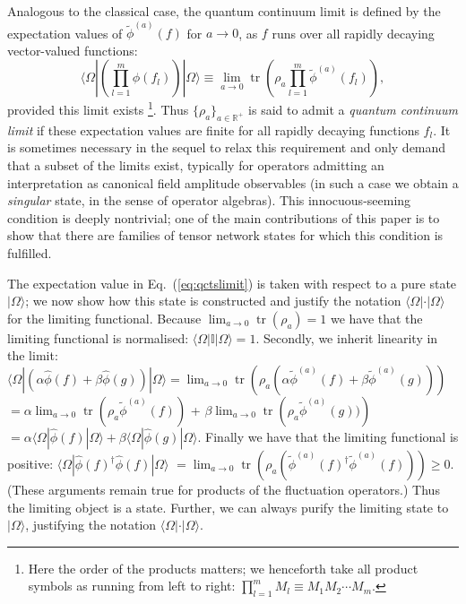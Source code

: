 \documentclass[prl,twocolumn,lengthcheck,superscriptaddress]{revtex4-1}
\newcommand{\tr}{\operatorname{tr}}
\theoremstyle{definition}
\theoremstyle{remark}
\begin{document}
Analogous to the classical case, the quantum continuum limit is defined by the expectation values of $\widetilde{\phi}^{(a)}(f)$ for $a\rightarrow 0$, as $f$ runs over all rapidly decaying vector-valued functions:
\begin{equation}\label{eq:qctslimit}
	\langle\Omega|\left(\prod_{l=1}^m\widehat{\phi}(f_l)\right)|\Omega\rangle \equiv \lim_{a\rightarrow 0} \tr\left(\rho_a \prod_{l=1}^m\widetilde{\phi}^{(a)}(f_l)\right),
\end{equation}
provided this limit exists \footnote{Here the order of the products matters; we henceforth take all product symbols as running from left to right: $\prod_{l=1}^m M_l \equiv M_1M_2\cdots M_m$.}. Thus $\{\rho_a\}_{a\in\mathbb{R}^+}$ is said to admit a \emph{quantum continuum limit} if these expectation values are finite for all rapidly decaying functions $f_l$. It is sometimes necessary in the sequel to relax this requirement and only demand that a subset of the limits exist, typically for operators admitting an interpretation as canonical field amplitude observables (in such a case we obtain a \emph{singular} state, in the sense of operator algebras). This innocuous-seeming condition is deeply nontrivial; one of the main contributions of this paper is to show that there are families of tensor network states for which this condition is fulfilled. 

The expectation value in Eq.~(\ref{eq:qctslimit}) is taken with respect to a pure state $|\Omega\rangle$; we now show how this state is constructed and justify the notation $\langle\Omega|\cdot |\Omega\rangle$ for the limiting functional. Because $\lim_{a\rightarrow0} \tr(\rho_a) = 1$ we have that the limiting functional is normalised: $\langle\Omega| \mathbb{I} |\Omega\rangle = 1$. Secondly, we inherit linearity in the limit: $\langle \Omega| (\alpha \widehat{\phi}(f) + \beta\widehat{\phi}(g))|\Omega\rangle = \lim_{a\rightarrow 0} \tr\left(\rho_a \left(\alpha \widetilde{\phi}^{(a)}(f) + \beta \widetilde{\phi}^{(a)}(g)\right) \right)$ $= \alpha\lim_{a\rightarrow 0} \tr\left(\rho_a  \widetilde{\phi}^{(a)}(f)\right)$ + $\beta\lim_{a\rightarrow 0} \tr\left(\rho_a \widetilde{\phi}^{(a)}(g)) \right)$ $=  \alpha \langle \Omega| \widehat{\phi}(f) |\Omega\rangle+ \beta\langle \Omega|\widehat{\phi}(g)|\Omega\rangle$. Finally we have that the limiting functional is positive: $\langle\Omega | \widehat{\phi}(f)^\dag \widehat{\phi}(f) |\Omega\rangle$ $= \lim_{a\rightarrow 0} \tr(\rho_a (\widetilde{\phi}^{(a)}(f)^\dag \widetilde{\phi}^{(a)}(f))) \ge 0$. (These arguments remain true for products of the fluctuation operators.) Thus the limiting object is a state. Further, we can always purify the limiting state to $|\Omega\rangle$, justifying the notation $\langle \Omega|\cdot|\Omega\rangle$.
\end{document}
